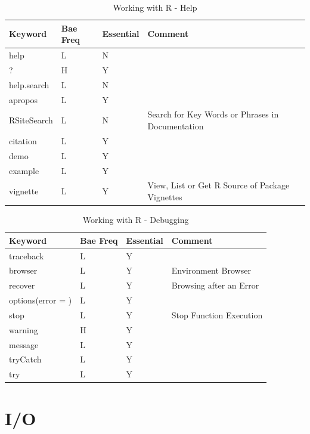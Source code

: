 \documentclass[11pt,]{krantz}
\theoremstyle{definition}
\theoremstyle{definition}
\theoremstyle{remark}
\begin{document}
\begin{table}

\caption{\label{tab:knitchunk22}Working with R - Help}
\centering
\begin{tabular}[t]{llll}
\toprule
Keyword & Bae Freq & Essential & Comment\\
\midrule
help & L & N & \\
? & H & Y & \\
help.search & L & N & \\
apropos & L & Y & \\
RSiteSearch & L & N & Search for Key Words or Phrases in Documentation\\
\addlinespace
citation & L & Y & \\
demo & L & Y & \\
example & L & Y & \\
vignette & L & Y & View, List or Get R Source of Package Vignettes\\
\bottomrule
\end{tabular}
\end{table}

\begin{table}

\caption{\label{tab:knitchunk23}Working with R - Debugging}
\centering
\begin{tabular}[t]{llll}
\toprule
Keyword & Bae Freq & Essential & Comment\\
\midrule
traceback & L & Y & \\
browser & L & Y & Environment Browser\\
recover & L & Y & Browsing after an Error\\
options(error = ) & L & Y & \\
stop & L & Y & Stop Function Execution\\
\addlinespace
warning & H & Y & \\
message & L & Y & \\
tryCatch & L & Y & \\
try & L & Y & \\
\bottomrule
\end{tabular}
\end{table}

\section{I/O}\label{io}
\end{document}
